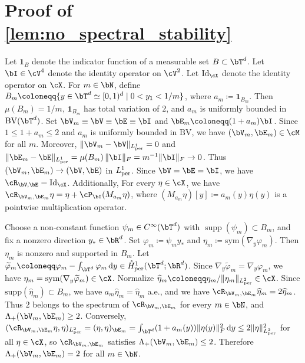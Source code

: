 \section{Proof of \cref{lem:no_spectral_stability}}
\label{app:no_spectral_stability}

Let $\mathbf{1}_B$ denote the indicator function of a measurable set $B\subset\bT^d$. Let $\bI\in\cV^4$ denote the identity operator on $\cV^2$. Let $\mathrm{Id}_{\cX}$ denote the identity operator on $\cX$. For $m\in\bN$, define $B_m\coloneqq \{y\in\bT^d\simeq [0,1)^d\mid 0< y_1<1/m\}$, where $a_m\coloneqq \mathbf{1}_{B_m}$.
Then $\mu(B_m)=1/m$, $\mathbf{1}_{B_m}$ has total variation of $2$, and $a_m$ is uniformly bounded in $\mathrm{BV}(\bT^d)$. Set $\bV_m\equiv \bV\equiv \bE \equiv \bI$ and $\bE_m\coloneqq (1+a_m)\bI$. Since $1\le 1+a_m\le 2$ and $a_m$ is uniformly bounded in $\mathrm{BV}$, we have $(\bV_m,\bE_m)\in\cM$ for all $m$. Moreover, $\|\bV_m-\bV\|_{L^1_{\rm per}}=0$ and $\|\bE_m-\bE\|_{L^1_{\rm per}}=\mu(B_m)\,\|\bI\|_F=m^{-1}\|\bI\|_F\to0$.
Thus $(\bV_m,\bE_m)\to(\bV,\bE)$ in $L^1_{\rm per}$. Since $\bV=\bE=\bI$, we have $\cR_{\bV,\bE}=\mathrm{Id}_{\cX}$. Additionally, For every $\eta\in\cX$, we have $\cR_{\bV_m,\bE_m}\eta=\eta+\cP_{\bI}(M_{a_m}\eta)$, where $(M_{a_m}\eta)[y]\coloneqq a_m(y)\eta(y)$ is a pointwise multiplication operator.

Choose a non-constant function $\psi_m\in C^\infty(\bT^d)$ with $\operatorname{supp}(\psi_m)\subset B_m$, and fix a nonzero direction $y_*\in\bR^d$. Set $\varphi_m\coloneqq \psi_m y_*$ and $\eta_m\coloneqq \mathrm{sym}(\nabla_y\varphi_m)$. Then $\eta_m$ is nonzero and supported in $B_m$. Let $\widetilde\varphi_m\coloneqq \varphi_m-\int_{\bT^d}\varphi_m\,\mathrm{d}y\in \mathring{H}^1_{\rm per}(\bT^d;\bR^d)$. Since $\nabla_y\widetilde\varphi_m=\nabla_y\varphi_m$, we have $\eta_m=\mathrm{sym}(\nabla_y\widetilde\varphi_m)\in\cX$. Normalize $\widehat\eta_m\coloneqq \eta_m/\|\eta_m\|_{L^2_{\rm per}}\in\cX$. Since $\mathrm{supp}(\widehat\eta_m)\subset B_m$, we have $a_m\widehat\eta_m=\widehat\eta_m$ a.e., and we have $\cR_{\bV_m,\bE_m}\widehat\eta_m
=2\widehat\eta_m$. Thus $2$ belongs to the spectrum of $\cR_{\bV_m,\bE_m}$ for every $m\in\bN$, and $\Lambda_+(\bV_m,\bE_m)\ge 2$. Conversely, 
$(\cR_{\bV_m,\bE_m}\eta,\eta)_{L^2_{\rm per}}
=(\eta,\eta)_{\bE_m}
=\int_{\bT^d}(1+a_m(y))\|\eta(y)\|_F^2\,\mathrm{d}y
\le 2\|\eta\|_{L^2_{\rm per}}^2$ for all $\eta\in\cX$, so $\cR_{\bV_m,\bE_m}$ satisfies $\Lambda_+(\bV_m,\bE_m)\le 2$.
Therefore $\Lambda_+(\bV_m,\bE_m)=2$ for all $m\in\bN$.